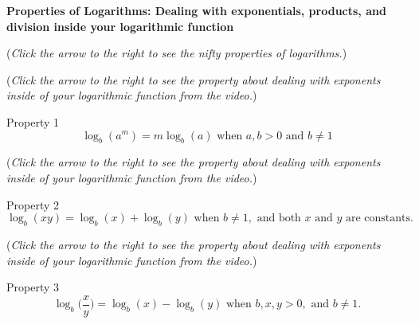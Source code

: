 \documentclass{ximera}
\begin{document}
\textbf{Properties of Logarithms: Dealing with exponentials, products,
and division inside your logarithmic function}
\begin{explanation}
\begin{flushright}
{\color{blue}(\emph{Click the arrow to the right to see the nifty properties of logarithms.})}
\end{flushright}
\begin{center}
\begin{expandable}
{\color{blue}(\emph{Click the arrow to the right to see the property
about dealing with exponents inside of your logarithmic function from the video.})}
\begin{expandable}
Property 1
\[
\log_b(a^m) = m\log_b(a) \text{ when }a,b>0\text{ and }b\neq 1
\]
\end{expandable}
{\color{blue}(\emph{Click the arrow to the right to see the property
about dealing with exponents inside of your logarithmic function from the video.})}
\begin{expandable}
Property 2
\[
\log_b (xy) = \log_b(x) + \log_b(y) \text{ when }b\neq 1, \text{ and both }x \text{ and }y\text{ are constants.}
\]
\end{expandable}
{\color{blue}(\emph{Click the arrow to the right to see the property
about dealing with exponents inside of your logarithmic function from the video.})}
\begin{expandable}
Property 3
\[
\log_b \Big(\frac{x}{y}\Big) = \log_b(x) - \log_b(y) \text{ when }b,x,y>0,\text{ and }b\neq 1.
\]
\end{expandable}
\end{expandable}
\end{center}
\end{explanation}
\end{document}
